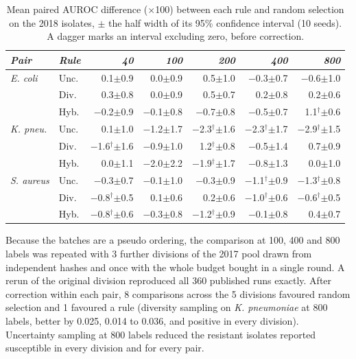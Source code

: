 \documentclass[conference,a4paper]{IEEEtran}
\begin{document}
\begin{table}[!t]
\caption{Mean paired AUROC difference ($\times$100) between each rule and random selection on the 2018 isolates, $\pm$ the half width of its 95\% confidence interval (10 seeds). A dagger marks an interval excluding zero, before correction.}
\label{tab:effects}
\centering\scriptsize
\setlength{\tabcolsep}{1.6pt}
\begin{tabular}{@{}llrrrrr@{}}
\toprule
\textit{Pair} & \textit{Rule} & \textit{40} & \textit{100} & \textit{200} & \textit{400} & \textit{800} \\
\midrule
\textit{E. coli} & Unc. & 0.1$\pm$0.9 & 0.0$\pm$0.9 & 0.5$\pm$1.0 & $-$0.3$\pm$0.7 & $-$0.6$\pm$1.0 \\
 & Div. & 0.3$\pm$0.8 & 0.0$\pm$0.9 & 0.5$\pm$0.7 & 0.2$\pm$0.8 & 0.2$\pm$0.6 \\
 & Hyb. & $-$0.2$\pm$0.9 & $-$0.1$\pm$0.8 & $-$0.7$\pm$0.8 & $-$0.5$\pm$0.7 & 1.1$^{\dagger}$$\pm$0.6 \\
\midrule
\textit{K. pneu.} & Unc. & 0.1$\pm$1.0 & $-$1.2$\pm$1.7 & $-$2.3$^{\dagger}$$\pm$1.6 & $-$2.3$^{\dagger}$$\pm$1.7 & $-$2.9$^{\dagger}$$\pm$1.5 \\
 & Div. & $-$1.6$^{\dagger}$$\pm$1.6 & $-$0.9$\pm$1.0 & 1.2$^{\dagger}$$\pm$0.8 & $-$0.5$\pm$1.4 & 0.7$\pm$0.9 \\
 & Hyb. & 0.0$\pm$1.1 & $-$2.0$\pm$2.2 & $-$1.9$^{\dagger}$$\pm$1.7 & $-$0.8$\pm$1.3 & 0.0$\pm$1.0 \\
\midrule
\textit{S. aureus} & Unc. & $-$0.3$\pm$0.7 & $-$0.1$\pm$1.0 & $-$0.3$\pm$0.9 & $-$1.1$^{\dagger}$$\pm$0.9 & $-$1.3$^{\dagger}$$\pm$0.8 \\
 & Div. & $-$0.8$^{\dagger}$$\pm$0.5 & 0.1$\pm$0.6 & 0.2$\pm$0.6 & $-$1.0$^{\dagger}$$\pm$0.6 & $-$0.6$^{\dagger}$$\pm$0.5 \\
 & Hyb. & $-$0.8$^{\dagger}$$\pm$0.6 & $-$0.3$\pm$0.8 & $-$1.2$^{\dagger}$$\pm$0.9 & $-$0.1$\pm$0.8 & 0.4$\pm$0.7 \\
\bottomrule
\end{tabular}
\end{table}


Because the batches are a pseudo ordering, the comparison at 100, 400 and 800 labels was repeated with 3 further divisions of the 2017 pool drawn from independent hashes and once with the whole budget bought in a single round. A rerun of the original division reproduced all 360 published runs exactly. After correction within each pair, 8 comparisons across the 5 divisions favoured random selection and 1 favoured a rule (diversity sampling on \textit{K. pneumoniae} at 800 labels, better by 0.025, 0.014 to 0.036, and positive in every division). Uncertainty sampling at 800 labels reduced the resistant isolates reported susceptible in every division and for every pair.
\end{document}
